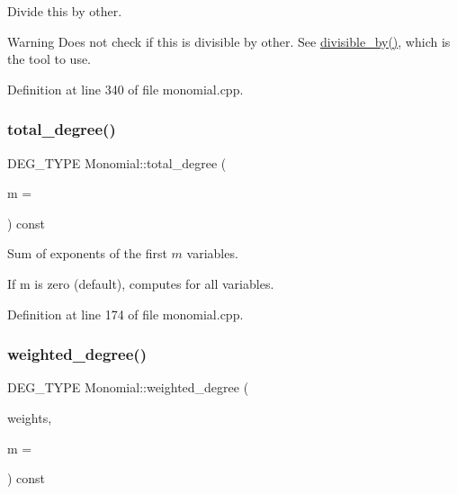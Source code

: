 Divide {\ttfamily this} by {\ttfamily other}. 

\begin{DoxyWarning}{Warning}
Does not check if {\ttfamily this} is divisible by other. See \hyperlink{class_monomial_aa0341b299fa1fcd4459f9a6810768f0e}{divisible\+\_\+by()}, which is the tool to use. 
\end{DoxyWarning}


Definition at line 340 of file monomial.\+cpp.

\mbox{\label{class_monomial_afe6df62857d9f58634d5f6c668f12d35}} 
\subsubsection{\texorpdfstring{total\+\_\+degree()}{total\_degree()}}
{\footnotesize\ttfamily D\+E\+G\+\_\+\+T\+Y\+PE Monomial\+::total\+\_\+degree (\begin{DoxyParamCaption}\item[{N\+V\+A\+R\+\_\+\+T\+Y\+PE}]{m = {} }\end{DoxyParamCaption}) const}



Sum of exponents of the first $m$ variables. 

If {\ttfamily m} is zero (default), computes for all variables. 

Definition at line 174 of file monomial.\+cpp.

\mbox{\label{class_monomial_a5b19863967dc9801997d2d1058f312a3}} 
\subsubsection{\texorpdfstring{weighted\+\_\+degree()}{weighted\_degree()}}
{\footnotesize\ttfamily D\+E\+G\+\_\+\+T\+Y\+PE Monomial\+::weighted\+\_\+degree (\begin{DoxyParamCaption}\item[{const W\+T\+\_\+\+T\+Y\+PE $\ast$}]{weights,  }\item[{N\+V\+A\+R\+\_\+\+T\+Y\+PE}]{m = {} }\end{DoxyParamCaption}) const}



